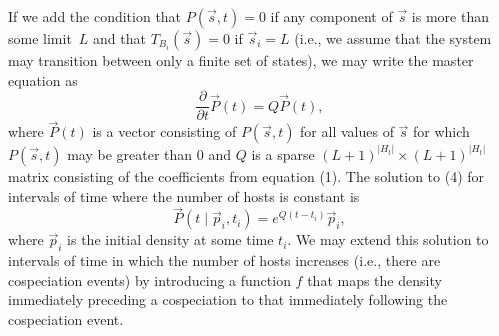 \documentclass{article}
\begin{document}
            If we add the condition that $P\left(\vec{s},t\right) = 0$ if any
            component of $\vec{s}$ is more than some limit~$L$ and that
            $T_{B_i}\left(\vec{s}\right) = 0$ if $\vec{s}_i = L$ (i.e., we
            assume that the system may transition between only a finite set of
            states), we may write the master equation as
            \begin{equation}
                \frac{\partial}{\partial t} \vec{P}\left(t\right) =
                Q\vec{P}\left(t\right),
            \end{equation}
            where $\vec{P}\left(t\right)$ is a vector consisting of
            $P\left(\vec{s}, t\right)$ for all values of $\vec{s}$ for which
            $P\left(\vec{s}, t\right)$ may be greater than 0 and $Q$ is a
            sparse $(L+1)^{\lvert{H_t}\rvert} \times (L+1)^{\lvert{H_t}\rvert}$
            matrix consisting of the coefficients from equation (1). The
            solution to (4) for intervals of time where the number of hosts is
            constant is
            \begin{equation}
                \vec{P}\left(t\mid\vec{p}_i, t_i\right) =
                e^{Q\left(t-t_i\right)}\vec{p}_i,
            \end{equation}
            where $\vec{p}_i$ is the initial density at some time $t_i$. We may
            extend this solution to intervals of time in which the number of
            hosts increases (i.e., there are cospeciation events) by
            introducing a function $f$ that maps the density immediately
            preceding a cospeciation to that immediately following the
            cospeciation event.
\end{document}
